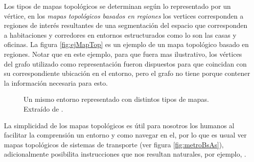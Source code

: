 Los tipos de mapas topológicos se determinan según lo representado por un vértice, en los \emph{mapas topológicos basados en regiones} los vertices corresponden a regiones de interés resultantes de una segmentación del espacio que corresponden a habitaciones y corredores en entornos estructurados como lo son las casas y oficinas. La figura \ref{fig:ejMapTop} es un ejemplo de un mapa topológico basado en regiones. Notar que en este ejemplo, para que fuera mas ilustrativo, los vértices del grafo utilizado como representación fueron dispuestos para que coincidan con su correspondiente ubicación en el entorno, pero el grafo no tiene porque contener la información necesaria para esto.

\begin{figure}[H]
  \centering
  \qquad
  \qquad
  \caption{Un mismo entorno representado con distintos tipos de mapas. Extraído de \cite{choset2005principles}.}
\end{figure}

La simplicidad de los mapas topológicos es útil para nosotros los humanos al facilitar la comprensión un entorno y como navegar en el, por lo que es usual ver mapas topológicos de sistemas de transporte (ver figura \ref{fig:metroBsAs}), adicionalmente posibilita instrucciones que nos resultan naturales, por ejemplo, .

